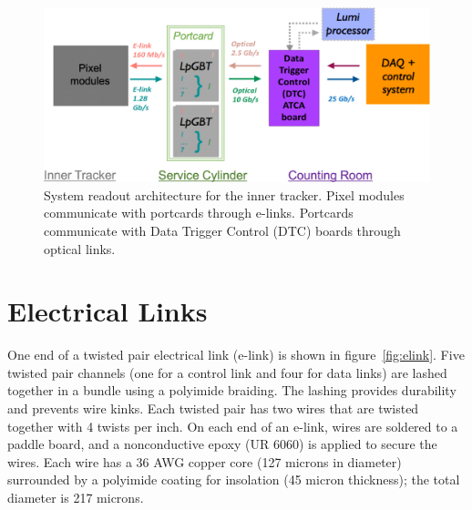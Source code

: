 \documentclass[a4paper,11pt]{article}
\begin{document}
\begin{figure}[htbp]
\centering
\includegraphics[width=1.0\textwidth,origin=c]{../figures/IT_System_Readout.jpg}
\caption{
\label{fig:readout}
System readout architecture for the inner tracker. Pixel modules communicate with portcards through e-links. Portcards communicate with Data Trigger Control (DTC) boards through optical links.
}
\end{figure}

\section{Electrical Links}
\label{sec:electrical}



%
%
%
%
%

One end of a twisted pair electrical link (e-link) is shown in figure~\ref{fig:elink}.
Five twisted pair channels (one for a control link and four for data links) are lashed together in a bundle using a polyimide braiding.
The lashing provides durability and prevents wire kinks.
Each twisted pair has two wires that are twisted together with 4 twists per inch.
On each end of an e-link, wires are soldered to a paddle board, and a nonconductive epoxy (UR 6060) is applied to secure the wires.
Each wire has a 36 AWG copper core (127 microns in diameter) surrounded by a polyimide coating for insolation (45 micron thickness); the total diameter is 217 microns.
\end{document}
